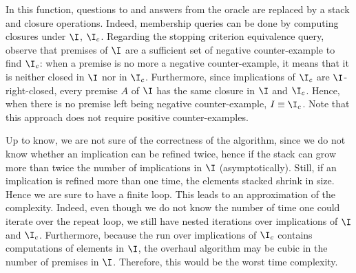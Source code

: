 \noindent In this function, questions to and answers from the oracle are replaced by a stack and closure operations. Indeed, membership queries can
be done by computing closures under $\I$, $\I_c$. Regarding the stopping 
criterion equivalence query, observe that premises of $\I$ are a sufficient set of negative counter-example to find $\I_c$: when a premise is no more a negative counter-example, it means that it is neither closed in $\I$ nor in 
$\I_c$. Furthermore, since implications of $\I_c$ are $\I$-right-closed, every
premise $A$ of $\I$ has the same closure in $\I$ and $\I_c$. Hence, when there
is no premise left being negative counter-example, $I \equiv \I_c$. Note that this approach does not require positive counter-examples. 

\vspace{1.2em}

Up to know, we are not sure of the correctness of the algorithm, since we do
not know whether an implication can be refined twice, hence if the stack can
grow more than twice the number of implications in $\I$ (asymptotically). Still, if an implication is refined more than one time, the elements stacked shrink in size. Hence we are sure to have a finite loop. This leads to an approximation of the complexity. Indeed, even though we do not know the number of time one could iterate over the repeat loop, we still have nested
iterations over implications of $\I$ and $\I_c$. Furthermore, because the run
over implications of $\I_c$ contains computations of elements in $\I$, the 
overhaul algorithm may be cubic in the number of premises in $\I$. Therefore,
this would be the worst time complexity.

\vspace{1.2em}

